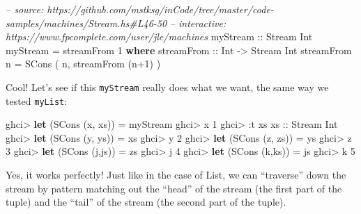 \documentclass[]{article}
\newenvironment{Shaded}{}{}
\newcommand{\KeywordTok}[1]{\textcolor[rgb]{0.00,0.44,0.13}{\textbf{{#1}}}}
\newcommand{\DataTypeTok}[1]{\textcolor[rgb]{0.56,0.13,0.00}{{#1}}}
\newcommand{\DecValTok}[1]{\textcolor[rgb]{0.25,0.63,0.44}{{#1}}}
\newcommand{\CommentTok}[1]{\textcolor[rgb]{0.38,0.63,0.69}{\textit{{#1}}}}
\newcommand{\OtherTok}[1]{\textcolor[rgb]{0.00,0.44,0.13}{{#1}}}
\newcommand{\FunctionTok}[1]{\textcolor[rgb]{0.02,0.16,0.49}{{#1}}}
\newcommand{\NormalTok}[1]{{#1}}
\begin{document}
\begin{Shaded}
\begin{Highlighting}[]
\CommentTok{-- source: https://github.com/mstksg/inCode/tree/master/code-samples/machines/Stream.hs#L46-50}
\CommentTok{-- interactive: https://www.fpcomplete.com/user/jle/machines}
\OtherTok{myStream ::} \DataTypeTok{Stream} \DataTypeTok{Int}
\NormalTok{myStream }\FunctionTok{=} \NormalTok{streamFrom }\DecValTok{1}
  \KeywordTok{where}
\OtherTok{    streamFrom ::} \DataTypeTok{Int} \OtherTok{->} \DataTypeTok{Stream} \DataTypeTok{Int}
    \NormalTok{streamFrom n }\FunctionTok{=} \DataTypeTok{SCons} \NormalTok{( n, streamFrom (n}\FunctionTok{+}\DecValTok{1}\NormalTok{) )}
\end{Highlighting}
\end{Shaded}

Cool! Let's see if this \texttt{myStream} really does what we want, the same way
we tested \texttt{myList}:

\begin{Shaded}
\begin{Highlighting}[]
\NormalTok{ghci}\FunctionTok{>} \KeywordTok{let} \NormalTok{(}\DataTypeTok{SCons} \NormalTok{(x, xs)) }\FunctionTok{=} \NormalTok{myStream}
\NormalTok{ghci}\FunctionTok{>} \NormalTok{x}
\DecValTok{1}
\NormalTok{ghci}\FunctionTok{>} \FunctionTok{:}\NormalTok{t xs}
\OtherTok{xs ::} \DataTypeTok{Stream} \DataTypeTok{Int}
\NormalTok{ghci}\FunctionTok{>} \KeywordTok{let} \NormalTok{(}\DataTypeTok{SCons} \NormalTok{(y, ys)) }\FunctionTok{=} \NormalTok{xs}
\NormalTok{ghci}\FunctionTok{>} \NormalTok{y}
\DecValTok{2}
\NormalTok{ghci}\FunctionTok{>} \KeywordTok{let} \NormalTok{(}\DataTypeTok{SCons} \NormalTok{(z, zs)) }\FunctionTok{=} \NormalTok{ys}
\NormalTok{ghci}\FunctionTok{>} \NormalTok{z}
\DecValTok{3}
\NormalTok{ghci}\FunctionTok{>} \KeywordTok{let} \NormalTok{(}\DataTypeTok{SCons} \NormalTok{(j,js)) }\FunctionTok{=} \NormalTok{zs}
\NormalTok{ghci}\FunctionTok{>} \NormalTok{j}
\DecValTok{4}
\NormalTok{ghci}\FunctionTok{>} \KeywordTok{let} \NormalTok{(}\DataTypeTok{SCons} \NormalTok{(k,ks)) }\FunctionTok{=} \NormalTok{js}
\NormalTok{ghci}\FunctionTok{>} \NormalTok{k}
\DecValTok{5}
\end{Highlighting}
\end{Shaded}

Yes, it works perfectly! Just like in the case of List, we can ``traverse'' down
the stream by pattern matching out the ``head'' of the stream (the first part of
the tuple) and the ``tail'' of the stream (the second part of the tuple).
\end{document}
